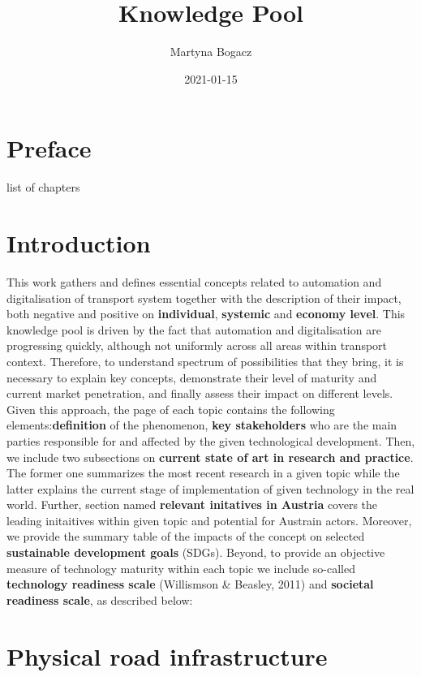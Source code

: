 \documentclass[
]{book}
\title{Knowledge Pool}
\author{Martyna Bogacz}
\date{2021-01-15}
\begin{document}
\maketitle

{
\setcounter{tocdepth}{1}
\tableofcontents
}
\hypertarget{preface}{%
\chapter*{Preface}\label{preface}}

list of chapters

\hypertarget{introduction}{%
\chapter{Introduction}\label{introduction}}

This work gathers and defines essential concepts related to automation and digitalisation of transport system together with the description of their impact, both negative and positive on \textbf{individual}, \textbf{systemic} and \textbf{economy level}. This knowledge pool is driven by the fact that automation and digitalisation are progressing quickly, although not uniformly across all areas within transport context. Therefore, to understand spectrum of possibilities that they bring, it is necessary to explain key concepts, demonstrate their level of maturity and current market penetration, and finally assess their impact on different levels. Given this approach, the page of each topic contains the following elements:\textbf{definition} of the phenomenon,
\textbf{key stakeholders} who are the main parties responsible for and affected by the given technological development. Then, we include two subsections on \textbf{current state of art in research and practice}. The former one summarizes the most recent research in a given topic while the latter explains the current stage of implementation of given technology in the real world. Further, section named \textbf{relevant initatives in Austria} covers the leading initaitives within given topic and potential for Austrain actors. Moreover, we provide the summary table of the impacts of the concept on selected \textbf{sustainable development goals} (SDGs). Beyond, to provide an objective measure of technology maturity within each topic we include so-called \textbf{technology readiness scale} (Willismson \& Beasley, 2011) and \textbf{societal readiness scale}, as described below:

\hypertarget{physical-road-infrastructure}{%
\chapter{Physical road infrastructure}\label{physical-road-infrastructure}}
\end{document}
